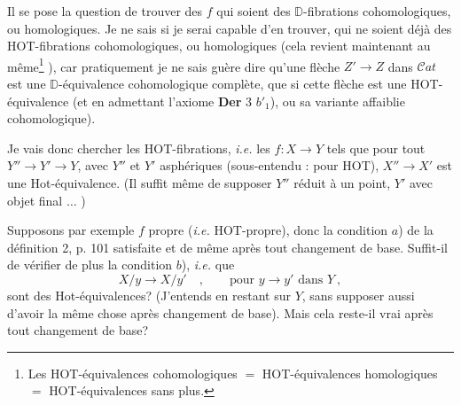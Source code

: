 \documentclass[11pt]{article}
\newcommand{\printedpage}[1]{\marginpar{\footnotesize p.~#1}}
\newcommand{\msp}[1]{\marginpar{\footnotesize [#1]}}
\newcommand{\HOT}{\textsf{HOT}}
\newcommand{\Hot}{\textsf{Hot}}
\newcommand{\Cat}{\mathcal{C}at}
\newcommand{\DD}{\mathbb{D}}
\begin{document}
\printedpage{64}

\msp{page 107}

Il se pose la question de trouver des $f$ qui soient des $\DD$-fibrations cohomologiques, ou homologiques. Je ne sais si je serai capable d'en trouver, qui ne soient déjà des \HOT-fibrations cohomologiques, ou homologiques (cela revient maintenant au même\footnote[55]{Les \HOT-équivalences cohomologiques $=$ \HOT-équivalences homologiques $=$ \HOT-équivalences sans plus.} ), car pratiquement je ne sais guère dire qu'une flèche $Z' \to Z$ dans $\Cat$ est une $\DD$-équivalence cohomologique complète, que si cette flèche est une \HOT-équivalence (et en admettant l'axiome \textbf{Der} 3 $b'_1$), ou sa variante affaiblie cohomologique).

Je vais donc chercher les \HOT-fibrations, \textit{i.e.} les $f : X \to Y$ tels que pour tout $Y'' \to Y' \to Y$, avec $Y''$ et $Y'$ asphériques (sous-entendu : pour \HOT), $X'' \to X'$ est une \Hot-équivalence. (Il suffit même de supposer $Y''$ réduit à un point, $Y'$ avec objet final $\ldots$ )

Supposons par exemple $f$ propre (\textit{i.e.} \HOT-propre), donc la condition $a$) de la définition 2, p. 101 satisfaite et de même après tout changement de base. Suffit-il de vérifier de plus la condition $b$), \textit{i.e.} que
\[ X/y \longrightarrow X/y' \quad , \qquad \text{pour } y \to y' \text{ dans } Y \ , \]
sont des \Hot-équivalences? (J'entends en restant sur $Y$, sans supposer aussi d'avoir la même chose après changement de base).
\msp{page 108}
Mais cela reste-il vrai après tout changement de base? %
\end{document}
